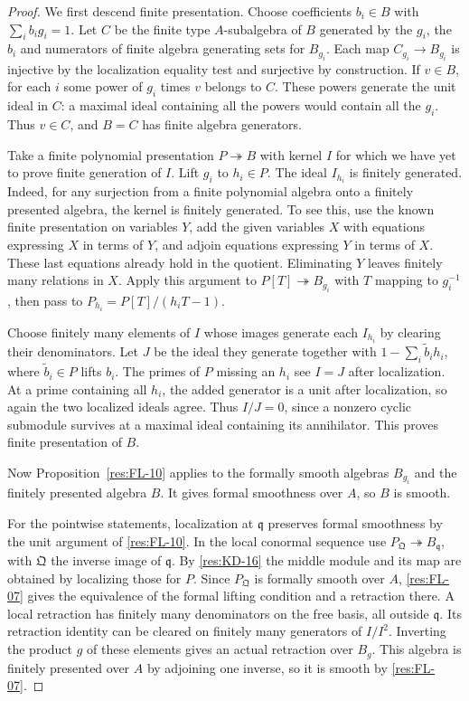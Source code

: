 \documentclass[11pt,oneside,openany]{book}
\theoremstyle{definition}
\theoremstyle{remark}
\begin{document}
\begin{proof}
We first descend finite presentation. Choose coefficients $b_i\in B$
with $\sum_i b_i g_i=1$. Let $C$ be the finite type $A$-subalgebra
of $B$ generated by the $g_i$, the $b_i$ and numerators of finite
algebra generating sets for $B_{g_i}$. Each map
$C_{g_i}\to B_{g_i}$ is injective by the localization equality
test and surjective by construction. If $v\in B$, for each $i$ some
power of $g_i$ times $v$ belongs to $C$. These powers generate
the unit ideal in $C$: a maximal ideal containing all the powers
would contain all the $g_i$. Thus $v\in C$, and $B=C$ has finite
algebra generators.

Take a finite polynomial presentation $P\twoheadrightarrow B$
with kernel $I$ for which we have yet to prove finite generation
of $I$. Lift $g_i$ to $h_i\in P$. The ideal $I_{h_i}$ is
finitely generated. Indeed, for any surjection from a finite
polynomial algebra onto a finitely presented algebra, the kernel
is finitely generated. To see this, use the known finite
presentation on variables $Y$, add the given variables $X$
with equations expressing $X$ in terms of $Y$, and adjoin
equations expressing $Y$ in terms of $X$. These last equations
already hold in the quotient. Eliminating $Y$ leaves finitely
many relations in $X$. Apply this argument to
$P[T]\twoheadrightarrow B_{g_i}$ with $T$ mapping to $g_i^{-1}$,
then pass to $P_{h_i}=P[T]/(h_iT-1)$.

Choose finitely many elements of $I$ whose images generate
each $I_{h_i}$ by clearing their denominators. Let $J$ be the
ideal they generate together with $1-\sum_i \widetilde b_i h_i$,
where $\widetilde b_i\in P$ lifts $b_i$. The primes of $P$ missing
an $h_i$ see $I=J$ after localization. At a prime containing all
$h_i$, the added generator is a unit after localization, so
again the two localized ideals agree. Thus $I/J=0$, since a
nonzero cyclic submodule survives at a maximal ideal containing
its annihilator. This proves finite presentation of $B$.

Now Proposition~\ref{res:FL-10} applies to the formally smooth
algebras $B_{g_i}$ and the finitely presented algebra $B$.
It gives formal smoothness over $A$, so $B$ is smooth.

For the pointwise statements, localization at $\mathfrak q$
preserves formal smoothness by the unit argument of
\ref{res:FL-10}. In the local conormal sequence use
$P_{\mathfrak Q}\twoheadrightarrow B_{\mathfrak q}$, with
$\mathfrak Q$ the inverse image of $\mathfrak q$. By
\ref{res:KD-16} the middle module and its map are obtained by
localizing those for $P$. Since $P_{\mathfrak Q}$ is formally
smooth over $A$, \ref{res:FL-07} gives the equivalence of the
formal lifting condition and a retraction there. A local
retraction has finitely many denominators on the free basis,
all outside $\mathfrak q$. Its retraction identity can be
cleared on finitely many generators of $I/I^2$. Inverting the
product $g$ of these elements gives an actual retraction over
$B_g$. This algebra is finitely presented over $A$ by adjoining
one inverse, so it is smooth by \ref{res:FL-07}.


\end{proof}
\end{document}
